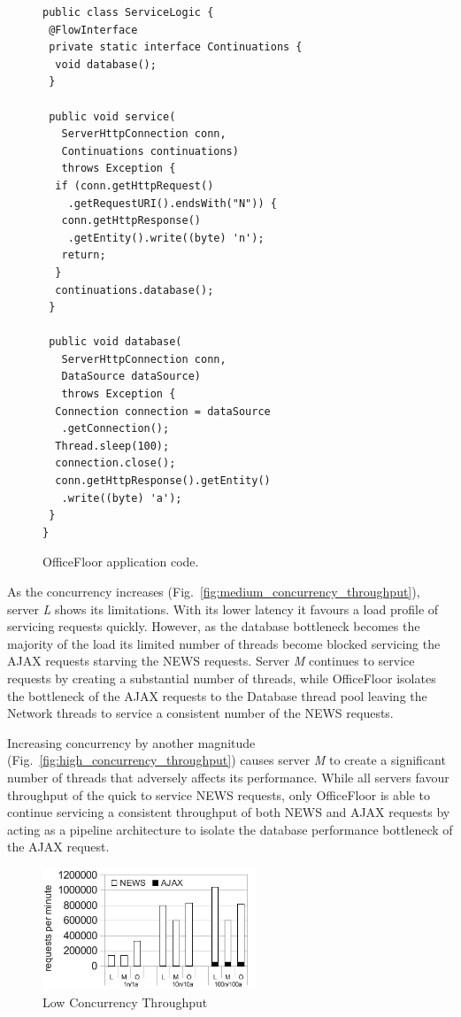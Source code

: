 \documentclass[conference]{ieee/IEEEtran}
\begin{document}
\begin{figure}[!t]
\begin{verbatim}
public class ServiceLogic {
 @FlowInterface
 private static interface Continuations {
  void database();
 }

 public void service(
   ServerHttpConnection conn, 
   Continuations continuations) 
   throws Exception { 
  if (conn.getHttpRequest()
    .getRequestURI().endsWith("N")) {
   conn.getHttpResponse()
    .getEntity().write((byte) 'n');
   return;
  }
  continuations.database();
 }

 public void database(
   ServerHttpConnection conn,
   DataSource dataSource) 
   throws Exception {
  Connection connection = dataSource
   .getConnection();
  Thread.sleep(100);
  connection.close();
  conn.getHttpResponse().getEntity()
   .write((byte) 'a');
 }
}
\end{verbatim}
\caption[Caption for Code]{OfficeFloor application code.\footnotemark }
\label{fig:officefloor_code}
\end{figure}


As the concurrency increases (Fig.~\ref{fig:medium_concurrency_throughput}),
server \textit{L} shows its limitations.  With its lower latency it favours a
load profile of servicing requests quickly.  However, as the database bottleneck
becomes the majority of the load its limited number of threads become blocked
servicing the AJAX requests starving the NEWS requests.  Server \textit{M}
continues to service requests by creating a substantial number of threads, while
OfficeFloor isolates the bottleneck of the AJAX requests to the Database thread
pool leaving the Network threads to service a consistent number of the NEWS
requests.

Increasing concurrency by another magnitude
(Fig.~\ref{fig:high_concurrency_throughput}) causes server \textit{M} to create
a significant number of threads that adversely affects its performance.  While
all servers favour throughput of the quick to service NEWS requests, only
OfficeFloor is able to continue servicing a consistent throughput of both NEWS
and AJAX requests by acting as a pipeline architecture to isolate the database
performance bottleneck of the AJAX request.

\begin{figure}[!t]
\centering 
\includegraphics[width=2.5in]{LowConcurrencyThroughput}
\caption{Low Concurrency Throughput}
\label{fig:low_concurrency_throughput}
\end{figure}
\end{document}
